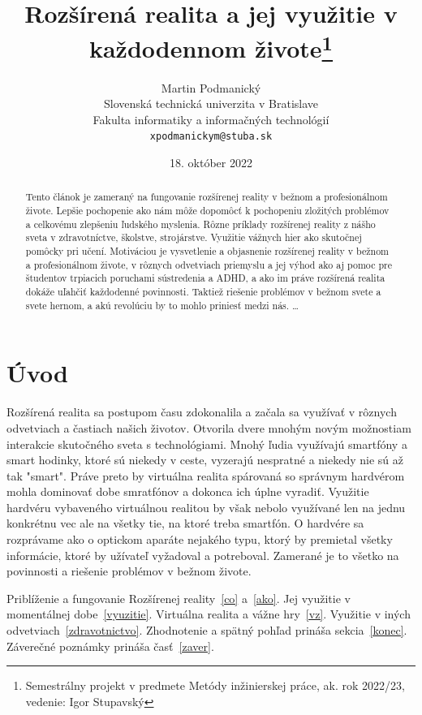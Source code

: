 \documentclass[10pt,twoside,a4paper]{article}
\title{Rozšírená realita a jej využitie v každodennom živote\thanks{Semestrálny projekt v predmete Metódy inžinierskej práce, ak. rok 2022/23, vedenie: Igor Stupavský}} %
\author{Martin Podmanický\\[2pt]
	{\small Slovenská technická univerzita v Bratislave}\\
	{\small Fakulta informatiky a informačných technológií}\\
	{\small \texttt{xpodmanickym@stuba.sk}}
	}
\date{\small 18. október 2022} %
\begin{document}
\maketitle

\begin{abstract}
Tento článok je zameraný na fungovanie rozšírenej reality v bežnom a profesionálnom živote. Lepšie pochopenie ako nám môže dopomôcť k pochopeniu zložitých problémov a celkovému zlepšeniu ľudského myslenia. Rôzne príklady rozšírenej reality z nášho sveta v zdravotníctve, školstve, strojárstve. Využitie vážnych hier ako skutočnej pomôcky pri učení. Motiváciou je vysvetlenie a objasnenie rozšírenej reality v bežnom a profesionálnom živote, v rôznych odvetviach priemyslu a jej výhod ako aj pomoc pre študentov trpiacich poruchami sústredenia a ADHD, a ako im práve rozšírená realita dokáže uľahčiť každodenné povinnosti. Taktiež riešenie problémov v bežnom svete a svete hernom, a akú revolúciu by to mohlo priniesť medzi nás.
\ldots
\end{abstract}



\section{Úvod}
\par Rozšírená realita sa postupom času zdokonalila a začala sa využívať v rôznych odvetviach a častiach našich životov. Otvorila dvere mnohým novým možnostiam interakcie skutočného sveta s technológiami. Mnohý ľudia využívajú smartfóny a smart hodinky, ktoré sú niekedy v ceste, vyzerajú nespratné a niekedy nie sú až tak "smart". Práve preto by virtuálna realita spárovaná so správnym hardvérom mohla dominovať dobe smratfónov a dokonca ich úplne vyradiť. Využitie hardvéru vybaveného virtuálnou realitou by však nebolo využívané len na jednu konkrétnu vec ale na všetky tie, na ktoré treba smartfón. O hardvére sa rozprávame ako o optickom aparáte nejakého typu, ktorý by premietal všetky informácie, ktoré by užívateľ vyžadoval a potreboval. Zamerané je to všetko na povinnosti a riešenie problémov v bežnom živote.


Priblíženie a fungovanie Rozšírenej reality~\ref{co} a~\ref{ako}.
Jej využitie v momentálnej dobe~\ref{vyuzitie}.
Virtuálna realita a vážne hry~\ref{vz}.
Využitie v iných odvetviach~\ref{zdravotnictvo}.
Zhodnotenie a spätný pohľad prináša sekcia~\ref{konec}.
Záverečné poznámky prináša časť~\ref{zaver}.
\end{document}
